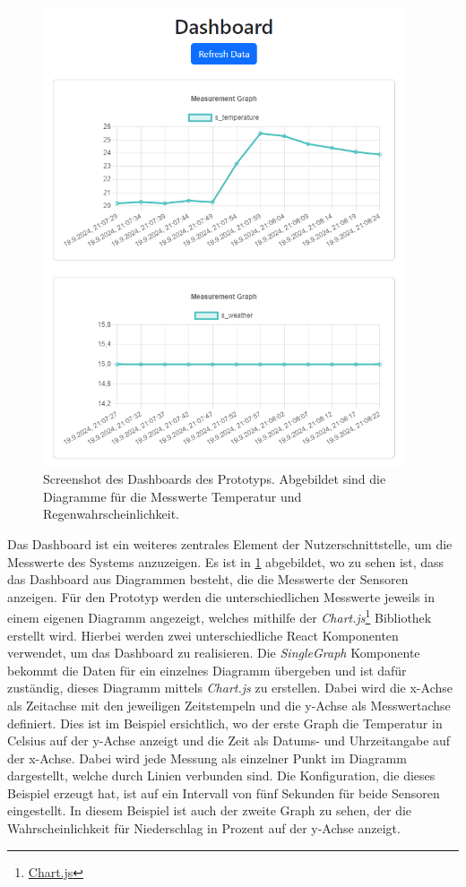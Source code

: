 \begin{figure}[!htbp]
	\centering
	\includegraphics[width=0.95\textwidth]{images/Dashboard.png}
	\caption[Dashboard des Prototyps]{
		Screenshot des Dashboards des Prototyps.
		Abgebildet sind die Diagramme für die Messwerte Temperatur und Regenwahrscheinlichkeit.
	}
	\label{pic:dashboard}
\end{figure}

Das Dashboard ist ein weiteres zentrales Element der Nutzerschnittstelle, um die Messwerte des Systems anzuzeigen.
Es ist in \cref{pic:dashboard} abgebildet, wo zu sehen ist, dass das Dashboard aus Diagrammen besteht, die die Messwerte der Sensoren anzeigen.
Für den Prototyp werden die unterschiedlichen Messwerte jeweils in einem eigenen Diagramm angezeigt, welches mithilfe der \emph{Chart.js}\footnote{\href{https://www.chartjs.org/}{Chart.js}} Bibliothek erstellt wird.
Hierbei werden zwei unterschiedliche React Komponenten verwendet, um das Dashboard zu realisieren.
Die \emph{SingleGraph} Komponente bekommt die Daten für ein einzelnes Diagramm übergeben und ist dafür zuständig, dieses Diagramm mittels \emph{Chart.js} zu erstellen.
Dabei wird die x-Achse als Zeitachse mit den jeweiligen Zeitstempeln und die y-Achse als Messwertachse definiert.
Dies ist im Beispiel ersichtlich, wo der erste Graph die Temperatur in Celsius auf der y-Achse anzeigt und die Zeit als Datums- und Uhrzeitangabe auf der x-Achse.
Dabei wird jede Messung als einzelner Punkt im Diagramm dargestellt, welche durch Linien verbunden sind.
Die Konfiguration, die dieses Beispiel erzeugt hat, ist auf ein Intervall von fünf Sekunden für beide Sensoren eingestellt.
In diesem Beispiel ist auch der zweite Graph zu sehen, der die Wahrscheinlichkeit für Niederschlag in Prozent auf der y-Achse anzeigt.

